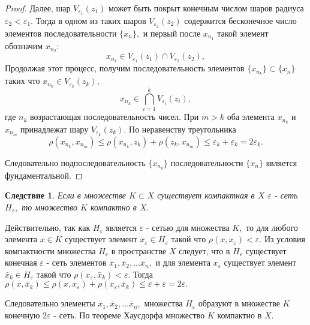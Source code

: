 \documentclass[12pt,a4paper,titlepage, oneside]{book}
\theoremstyle{definition}
\theoremstyle{plain}
\theoremstyle{remark}
\theoremstyle{remark}
\theoremstyle{remark}
\theoremstyle{plain}
\theoremstyle{plain}
\newtheorem*{corollary}{Следствие}
\begin{document}
\begin{proof}
Далее, шар $ V_{\varepsilon _1} (z_1) $ может быть покрыт конечным числом шаров радиуса $\varepsilon _2 < \varepsilon _1.$ Тогда в одном из таких шаров $V_{\varepsilon _2} (z_2)$ содержится бесконечное число элементов последовательности $\{x_n\},$ и первый после $x_{n_1}$ такой элемент обозначим $x_{n_2}:$
\begin{equation*}
x_{n_1} \in V_{\varepsilon _1} (z_1) \cap V_{\varepsilon _2} (z_2),
\end{equation*}
Продолжая этот процесс, получим последовательность элементов $\{x_{n_k}\} \subset \{x_n\}$ таких что $x_{n_k} \in V_{\varepsilon _k} (z_k),$
\begin{equation*}
x_{n_k} \in \bigcap\limits_{i=1}^{k} V_{\varepsilon _i} (z_i),
\end{equation*}
где $n_k$  возрастающая последовательность чисел. При $m > k$ оба элемента $x_{n_k}$ и $x_{n_m}$ принадлежат шару $V_{\varepsilon _k} (z_k).$ По неравенству треугольника 
\begin{equation*}
\rho(x_{n_k}, x_{n_m}) \leqslant \rho(x_{n_k}, z_k) + \rho(z_k, x_{n_m}) \leqslant \varepsilon_k + \varepsilon_k = 2 \varepsilon _k.
\end{equation*}
 
Следовательно подпоследовательность $\{x_{n_k}\}$ последовательности $\{x_n\}$ является фундаментальной.
\end{proof}

\begin{corollary}
Если в множестве $K \subset X$ существует компактная в $X$ $\varepsilon$ \-- сеть $H_{\varepsilon},$ то множество $K$ компактно в $X.$ 
\end{corollary}

Действительно, так как $H_{\varepsilon} $ является $\varepsilon$ \-- сетью для множества $K,$ то для любого элемента $x \in K$ существует элемент $x_{\varepsilon} \in H_{\varepsilon}$ такой что $\rho(x, x_{\varepsilon}) < \varepsilon.$ Из условия компактности множества $H_{\varepsilon}$ в пространстве $X$ следует, что в  $H_{\varepsilon}$ существует конечная $\varepsilon$ \-- сеть элементов $\bar{x}_1, \bar{x}_2,\ldots \bar{x}_n,$ и для элемента $x_{\varepsilon}$ существует элемент $\bar{x}_k \in H_{\varepsilon}$ такой что $\rho(x_{\varepsilon}, \bar{x}_k) < \varepsilon.$ Тогда $\rho(x, \bar{x}_k) \leqslant \rho(x, x_{\varepsilon}) + \rho(x_{\varepsilon}, \bar{x}_k) \leqslant \varepsilon + \varepsilon = 2 \varepsilon.$

Следовательно элементы $\bar{x}_1, \bar{x}_2,\ldots \bar{x}_n,$ множества $H_{\varepsilon}$ образуют в множестве $K$ конечную $2 \varepsilon$ \-- сеть. По теореме Хаусдорфа множество $K$ компактно в $X.$
\end{document}
